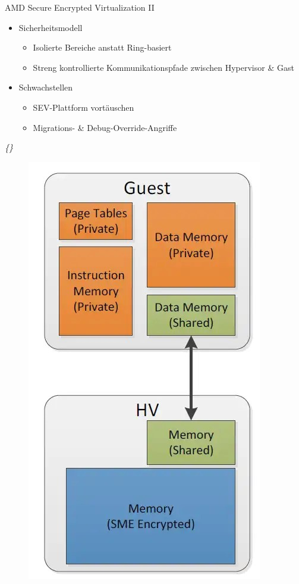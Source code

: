 \documentclass{sdqbeamer}
\begin{document}
\begin{frame}{AMD Secure Encrypted Virtualization II}
	\begin{minipage}{0.6\linewidth}
		\begin{itemize}
			\item Sicherheitsmodell
			\begin{itemize}
				\item Isolierte Bereiche anstatt Ring-basiert
				\item Streng kontrollierte Kommunikationspfade zwischen Hypervisor \& Gast
			\end{itemize}
			\item Schwachstellen
			\begin{itemize}
				\item SEV-Plattform vortäuschen
				\item Migrations- \& Debug-Override-Angriffe
			\end{itemize}
		\end{itemize}
		\vspace{3ex}
		\vfill
		\small\textit{\{\cite{kaplan, buhren}\}}
	\end{minipage}
	\begin{minipage}{0.39\linewidth}
		\begin{figure}[!h]
			\centering
			\includegraphics[width=0.45\linewidth]{Bilder/AMD_Guest_HV.jpg}

\end{figure}
\end{minipage}
\end{frame}
\end{document}
